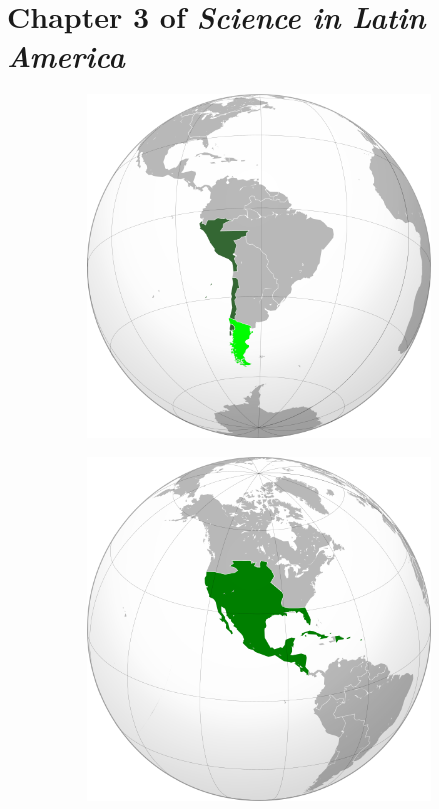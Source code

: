 \documentclass[12pt]{article}
\begin{document}
\maketitle

\small

\section{Chapter 3 of \textit{Science in Latin America}}

\begin{figure}[ht]
\centering
\begin{subfigure}{0.125\textwidth}
\includegraphics[width=\textwidth]{vice_peru.png}
\caption{\label{fig:1a}}
\end{subfigure}
\begin{subfigure}{0.125\textwidth}
\includegraphics[width=\textwidth]{vice_nuevaespana.png}

\end{subfigure}
\end{figure}
\end{document}
